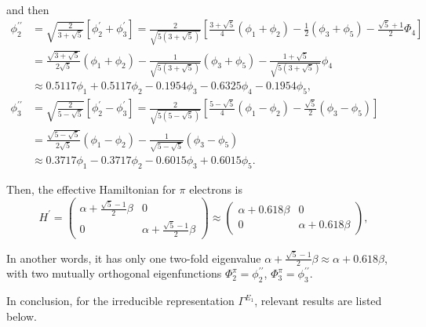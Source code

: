 \documentclass[a4paper]{book}
\begin{document}
\begin{solution}
\begin{enumerate}[label=(\alph*)]
\begin{align*}
		\end{align*}
		and then
		\begin{align*}
			\phi^{\prime\prime}_2 &= \sqrt{ \frac{2}{3+\sqrt{5}} } \left[ \phi^\prime_2 + \phi^\prime_3 \right] = \frac{2}{ \sqrt{5(3+\sqrt{5})} } \left[ \frac{3+\sqrt{5}}{4}(\phi_1 + \phi_2) - \frac{1}{2} (\phi_3 + \phi_5) - \frac{ \sqrt{5}+1 }{2} \Phi_4 \right]\\
			&= \frac{ \sqrt{3+\sqrt{5}} }{2\sqrt{5}}(\phi_1 + \phi_2) - \frac{1}{ \sqrt{ 5(3+\sqrt{5}) } } (\phi_3 + \phi_5) - \frac{ 1+\sqrt{5} }{ \sqrt{ 5(3+\sqrt{5}) } } \phi_4 \\
			&\approx 0.5117 \phi_1 + 0.5117 \phi_2 -0.1954 \phi_3 -0.6325\phi_4 -0.1954 \phi_5 , \\
			\phi^{\prime\prime}_3 &= \sqrt{ \frac{2}{5-\sqrt{5}} } \left[ \phi^\prime_2 - \phi^\prime_3 \right] = \frac{2}{ \sqrt{5(5-\sqrt{5})} }\left[ \frac{ 5-\sqrt{5} }{4} (\phi_1 - \phi_2) - \frac{ \sqrt{5} }{2} (\phi_3 - \phi_5) \right] \\
			&= \frac{ \sqrt{ 5-\sqrt{5} } }{ 2\sqrt{5} } (\phi_1 - \phi_2) - \frac{ 1 }{ \sqrt{ 5-\sqrt{5} } }(\phi_3 - \phi_5) \\
			&\approx 0.3717 \phi_1 - 0.3717 \phi_2 - 0.6015\phi_3 + 0.6015 \phi_5.
		\end{align*}
		
		Then, the effective Hamiltonian for $\pi$ electrons is
		\begin{equation*}
			H^\prime = \begin{pmatrix}
				\alpha + \frac{ \sqrt{5}-1 }{2}\beta & 0 \\
				0 & \alpha + \frac{ \sqrt{5}-1 }{2}\beta
			\end{pmatrix} \approx
			\begin{pmatrix}
				\alpha + 0.618 \beta & 0 \\ 0 & \alpha + 0.618 \beta
			\end{pmatrix}				,
		\end{equation*}
		
		In another words, it has only one two-fold eigenvalue $\alpha + \frac{ \sqrt{5}-1 }{2} \beta\approx \alpha + 0.618 \beta$, with two mutually orthogonal eigenfunctions $\Phi^\pi_2 = \phi^{\prime\prime}_2$, $\Phi^\pi_3 = \phi^{\prime\prime}_3$.
		
		In conclusion, for the irreducible representation $\Gamma^{E_1}$, relevant results are listed below.
		

\end{enumerate}
\end{solution}
\end{document}
